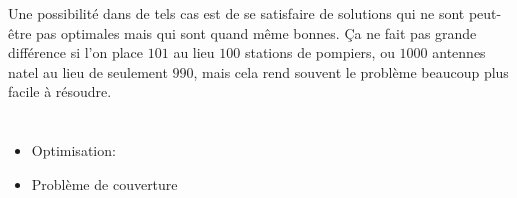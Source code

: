 {{Une possibilité dans de tels cas est de se satisfaire de solutions qui ne sont peut-être pas optimales mais qui sont quand même bonnes. Ça ne fait pas grande différence si l’on place $101$ au lieu $100$ stations de pompiers, ou $1000$ antennes natel au lieu de seulement $990$, mais cela rend souvent le problème beaucoup plus facile à résoudre.



\section*{\BrochureWebsitesAndKeywords}
{\raggedright
\begin{itemize}
  \item Optimisation: \href{https://fr.wikipedia.org/wiki/Optimisation_(math\%C3\%A9matiques)}{}
  \item Problème de couverture
\end{itemize}


}

}{}

\def\AuthorTomcsanyiovaM{} %
\def\AuthorBudinskaL{} %
\def\AuthorTomcsanyiP{} %
\def\AuthorVanicekJ{} %
\def\AuthorBellettiniC{} %
\def\AuthorDatzkoC{} %
\def\AuthorDatzkoS{} %
\def\AuthorBaumannW{} %
\def\AuthorFreiF{} %
\def\AuthorPelletE{} %

\newpage}{}
